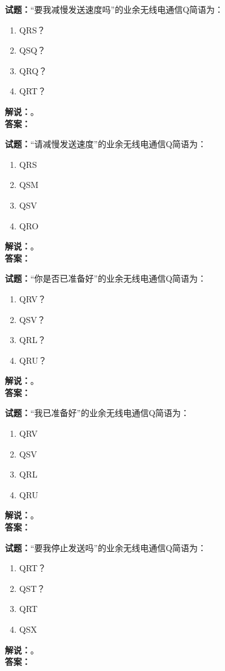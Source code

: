 \documentclass{ctexbook}
\begin{document}
\bigskip

\noindent\textbf{试题：}“要我减慢发送速度吗”的业余无线电通信Q简语为：
\begin{enumerate}[leftmargin=3em]
  \item QRS？
  \item QSQ？
  \item QRQ？
  \item QRT？
\end{enumerate}
\noindent\textbf{解说：}\textbf{}。\\\noindent\textbf{答案：}

\bigskip

\noindent\textbf{试题：}“请减慢发送速度”的业余无线电通信Q简语为：
\begin{enumerate}[leftmargin=3em]
  \item QRS
  \item QSM
  \item QSV
  \item QRO
\end{enumerate}
\noindent\textbf{解说：}\textbf{}。\\\noindent\textbf{答案：}

\bigskip

\noindent\textbf{试题：}“你是否已准备好”的业余无线电通信Q简语为：
\begin{enumerate}[leftmargin=3em]
  \item QRV？
  \item QSV？
  \item QRL？
  \item QRU？
\end{enumerate}
\noindent\textbf{解说：}\textbf{}。\\\noindent\textbf{答案：}

\bigskip

\noindent\textbf{试题：}“我已准备好”的业余无线电通信Q简语为：
\begin{enumerate}[leftmargin=3em]
  \item QRV
  \item QSV
  \item QRL
  \item QRU
\end{enumerate}
\noindent\textbf{解说：}\textbf{}。\\\noindent\textbf{答案：}

\bigskip

\noindent\textbf{试题：}“要我停止发送吗”的业余无线电通信Q简语为：
\begin{enumerate}[leftmargin=3em]
  \item QRT？
  \item QST？
  \item QRT
  \item QSX
\end{enumerate}
\noindent\textbf{解说：}\textbf{}。\\\noindent\textbf{答案：}
\end{document}
